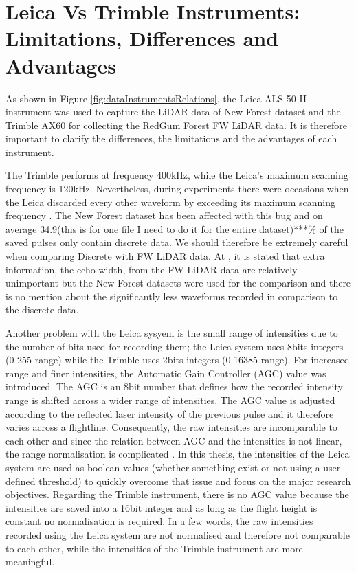 \documentclass{subfiles}
\begin{document}
	\section{Leica Vs Trimble Instruments: Limitations, Differences and Advantages}\label{sec:LeicaVsTrimble}
	
	
	\par As shown in Figure \ref{fig:dataInstrumentsRelations}, the Leica ALS 50-II instrument was used to capture the LiDAR data of New Forest dataset and the Trimble AX60 for collecting the RedGum Forest FW LiDAR data. It is therefore important to clarify the differences, the limitations and the advantages of each instrument. 
	
	\par The Trimble performs at frequency 400kHz, while the Leica's maximum scanning frequency is 120kHz. Nevertheless, during experiments there were occasions when the Leica discarded every other waveform by exceeding its maximum scanning frequency \cite{Warren2012}. The New Forest dataset has been affected with this bug and on average 34.9(this is for one file I need to do it for the entire dataset)***\% of the saved pulses only contain discrete data. We should therefore be extremely careful when comparing Discrete with FW LiDAR data. At \cite{Sumnall2016}, it is stated that extra information, the echo-width, from the FW LiDAR data are relatively unimportant but the New Forest datasets were used for the comparison and there is no mention about the significantly less waveforms recorded in comparison to the discrete data.   
	
	\par Another problem with the Leica sysyem is the small range of intensities due to the number of bits used for recording them; the Leica system uses 8bits integers (0-255 range) while the Trimble uses 2bits integers (0-16385 range). For increased range and finer intensities, the Automatic Gain Controller (AGC) value was introduced. The AGC is an 8bit number that defines how the recorded intensity range is shifted across a wider range of intensities. The AGC value is adjusted according to the reflected laser intensity of the previous pulse and it therefore varies across a flightline. Consequently, the raw intensities are incomparable to each other and since the relation between AGC and the intensities is not linear, the range normalisation is complicated \cite{Lehner2011}\cite{Korpela2010}. In this thesis, the intensities of the Leica system are used as boolean values (whether something exist or not using a user-defined threshold) to quickly overcome that issue and focus on the major research objectives. Regarding the Trimble instrument, there is no AGC value because the intensities are saved into a 16bit integer and as long as the flight height is constant no normalisation is required. In a few words, the raw intensities recorded using the Leica system are not normalised and therefore not comparable to each other, while the intensities of the Trimble instrument are more meaningful. 
	
\end{document}
